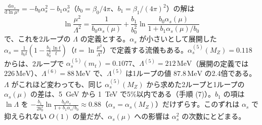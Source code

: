 \documentclass[a4paper,10pt]{ltjsarticle}
\newcommand{\dd}{\mathrm{d}}
\begin{document}
$\frac{\dd\alpha_s}{\dd\ln\mu^2}=-b_0\alpha_s^2-b_1\alpha_s^3$（$b_0=\beta_0/4\pi$、$b_1=\beta_1/(4\pi)^2$）の解は
\begin{equation}
\ln\frac{\mu^2}{\Lambda^2}=\frac1{b_0\alpha_s(\mu)}+\frac{b_1}{b_0^2}\ln\frac{b_0\alpha_s(\mu)}{1+b_1\alpha_s(\mu)/b_0}
\label{eq:run2}
\end{equation}
で、これを2ループの $\Lambda$ の定義とする。$\alpha_s$ が小さいとして展開した $\alpha_s=\frac{1}{b_0t}(1-\frac{b_1}{b_0^2}\frac{\ln t}{t})$（$t=\ln\frac{\mu^2}{\Lambda^2}$）で定義する流儀もある。$\alpha_s^{(5)}(M_Z)=0.118$ からは、2ループで $\alpha_s^{(5)}(m_t)=0.1077$、$\Lambda^{(5)}=212\,\mathrm{MeV}$（展開の定義では $226\,\mathrm{MeV}$）、$\Lambda^{(6)}=88\,\mathrm{MeV}$ で、$\Lambda^{(5)}$ は1ループの値 $87.8\,\mathrm{MeV}$ の2.4倍である。$\Lambda$ がこれほど変わっても、同じ $\alpha_s^{(5)}(M_Z)$ から求めた2ループと1ループの $\alpha_s(\mu)$ の差は、5~GeV から 1~TeV で5\%以内である（手順 (7)）。$b_1$ の項は $\ln\Lambda$ を $-\frac{b_1}{2b_0^2}\ln\frac{b_0\alpha_s}{1+b_1\alpha_s/b_0}\approx0.88$（$\alpha_s=\alpha_s(M_Z)$）だけずらす。このずれは $\alpha_s$ で抑えられない $O(1)$ の量だが、$\alpha_s(\mu)$ への影響は $\alpha_s^2$ の次数にとどまる。
\end{document}
